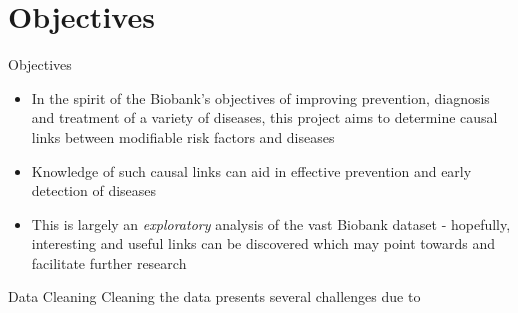 \documentclass[10pt]{beamer} %
\begin{document}
\section{Objectives}
\begin{frame}[plain]{Objectives}
\begin{itemize}
\item In the spirit of the Biobank's objectives of improving prevention, diagnosis and treatment of a variety of diseases, this project aims to determine causal links between modifiable risk factors and diseases \\

\vspace{0.4cm}

\item Knowledge of such causal links can aid in effective prevention and early detection of diseases

\vspace{0.4cm}


\item This is largely an \emph{exploratory} analysis of the vast Biobank dataset - hopefully, interesting and useful links can be discovered which may point towards and facilitate further research

\end{itemize}
\end{frame}




\begin{frame}[plain]{Data Cleaning}
Cleaning the data presents several challenges due to 









\end{frame}
\end{document}
